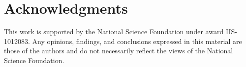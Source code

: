 \documentclass[letterpaper]{article}
\begin{document}
\section*{Acknowledgments}
This work is supported by the National Science Foundation under award
IIS-1012083. Any opinions, findings, and conclusions expressed in this material
are those of the authors and do not necessarily reflect the views of the
National Science Foundation.



\end{document}
